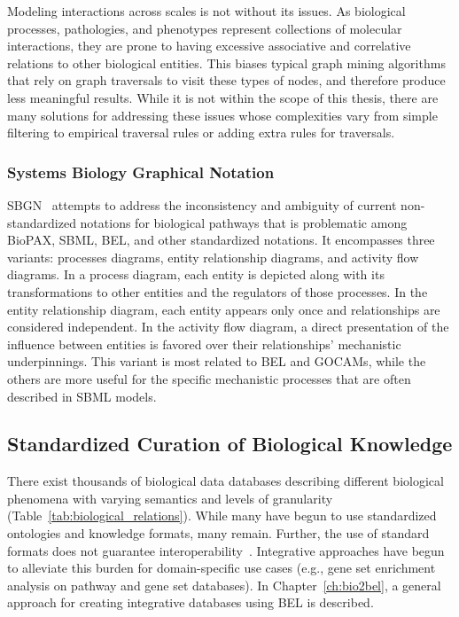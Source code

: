 Modeling interactions across scales is not without its issues.
As biological processes, pathologies, and phenotypes represent collections of molecular interactions, they are prone to having excessive associative and correlative relations to other biological entities.
This biases typical graph mining algorithms that rely on graph traversals to visit these types of nodes, and therefore produce less meaningful results.
While it is not within the scope of this thesis, there are many solutions for addressing these issues whose complexities vary from simple filtering to empirical traversal rules or adding extra rules for traversals.

\subsubsection{Systems Biology Graphical Notation}

\ac{SBGN}~\cite{LeNovere2009} attempts to address the inconsistency and ambiguity of current non-standardized notations for biological pathways that is problematic among \ac{BioPAX}, \ac{SBML}, \ac{BEL}, and other standardized notations.
It encompasses three variants: processes diagrams, entity relationship diagrams, and activity flow diagrams.
In a process diagram, each entity is depicted along with its transformations to other entities and the regulators of those processes.
In the entity relationship diagram, each entity appears only once and relationships are considered independent.
In the activity flow diagram, a direct presentation of the influence between entities is favored over their relationships' mechanistic underpinnings.
This variant is most related to \ac{BEL} and \acp{GOCAM}, while the others are more useful for the specific mechanistic processes that are often described in \ac{SBML} models.

\subsection{Standardized Curation of Biological Knowledge}
\label{subsec:standardized_curation}

There exist thousands of biological data databases describing different biological phenomena with varying semantics and levels of granularity (Table~\ref{tab:biological_relations}).
While many have begun to use standardized ontologies and knowledge formats, many remain.
Further, the use of standard formats does not guarantee interoperability~\cite{Domingo-Fernandez2019a}.
Integrative approaches have begun to alleviate this burden for domain-specific use cases (e.g., gene set enrichment analysis on pathway and gene set databases).
In Chapter~\ref{ch:bio2bel}, a general approach for creating integrative databases using BEL is described.

